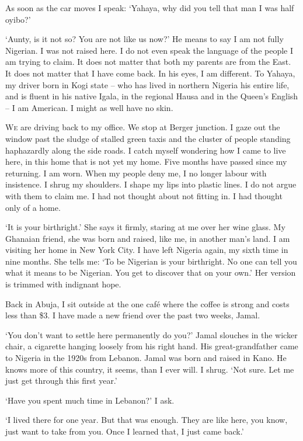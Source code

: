 \documentclass[../main.tex]{subfiles}
\begin{document}
\begin{multicols}{2}
As soon as the car moves I speak: ‘Yahaya, why did you tell that man I was half oyibo?’ 

‘Aunty, is it not so? You are not like us now?’ He means to say I am not fully Nigerian. I was not raised here. I do not even speak the language of the people I am trying to claim. It does not matter that both my parents are from the East. It does not matter that I have come back. In his eyes, I am different. To Yahaya, my driver born in Kogi state – who has lived in northern Nigeria his entire life, and is fluent in his native Igala, in the regional Hausa and in the Queen’s English – I am American. I might as well have no skin. 

\lettrine{W}{e} are driving back to my office. We stop at Berger junction. I gaze out the window past the sludge of stalled green taxis and the cluster of people standing haphazardly along the side roads. I catch myself wondering how I came to live here, in this home that is not yet my home. Five months have passed since my returning. I am worn. When my people deny me, I no longer labour with insistence. I shrug my shoulders. I shape my lips into plastic lines. I do not argue with them to claim me. I had not thought about not fitting in. I had thought only of a home. 

‘It is your birthright.’ She says it firmly, staring at me over her wine glass. My Ghanaian friend, she was born and raised, like me, in another man’s land. I am visiting her home in New York City. I have left Nigeria again, my sixth time in nine months. She tells me: ‘To be Nigerian is your birthright. No one can tell you what it means to be Nigerian. You get to discover that on your own.’ Her version is trimmed with indignant hope. 

Back in Abuja, I sit outside at the one café where the coffee is strong and costs less than \$3. I have made a new friend over the past two weeks, Jamal. 

‘You don’t want to settle here permanently do you?’ Jamal slouches in the wicker chair, a cigarette hanging loosely from his right hand. His great-grandfather came to Nigeria in the 1920s from Lebanon. Jamal was born and raised in Kano. He knows more of this country, it seems, than I ever will. I shrug. ‘Not sure. Let me just get through this first year.’ 

‘Have you spent much time in Lebanon?’ I ask. 

‘I lived there for one year. But that was enough. They are like here, you know, just want to take from you. Once I learned that, I just came back.’ 


\end{multicols}
\end{document}
